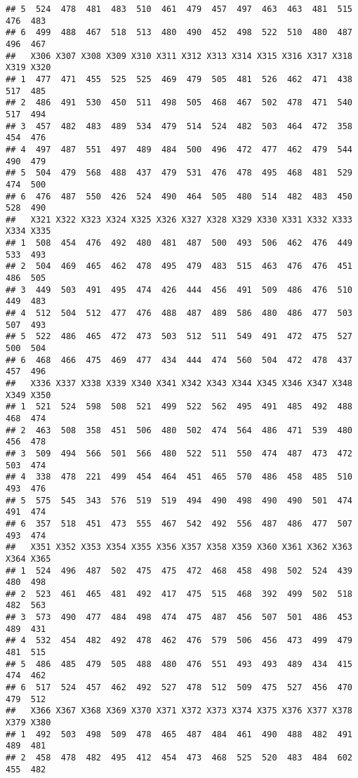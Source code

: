 \documentclass[
]{article}
\begin{document}
\begin{verbatim}
## 5  524  478  481  483  510  461  479  457  497  463  463  481  515  476  483
## 6  499  488  467  518  513  480  490  452  498  522  510  480  487  496  467
##   X306 X307 X308 X309 X310 X311 X312 X313 X314 X315 X316 X317 X318 X319 X320
## 1  477  471  455  525  525  469  479  505  481  526  462  471  438  517  485
## 2  486  491  530  450  511  498  505  468  467  502  478  471  540  517  494
## 3  457  482  483  489  534  479  514  524  482  503  464  472  358  454  476
## 4  497  487  551  497  489  484  500  496  472  477  462  479  544  490  479
## 5  504  479  568  488  437  479  531  476  478  495  468  481  529  474  500
## 6  476  487  550  426  524  490  464  505  480  514  482  483  450  528  490
##   X321 X322 X323 X324 X325 X326 X327 X328 X329 X330 X331 X332 X333 X334 X335
## 1  508  454  476  492  480  481  487  500  493  506  462  476  449  533  493
## 2  504  469  465  462  478  495  479  483  515  463  476  476  451  486  505
## 3  449  503  491  495  474  426  444  456  491  509  486  476  510  449  483
## 4  512  504  512  477  476  488  487  489  586  480  486  477  503  507  493
## 5  522  486  465  472  473  503  512  511  549  491  472  475  527  500  504
## 6  468  466  475  469  477  434  444  474  560  504  472  478  437  457  496
##   X336 X337 X338 X339 X340 X341 X342 X343 X344 X345 X346 X347 X348 X349 X350
## 1  521  524  598  508  521  499  522  562  495  491  485  492  488  468  474
## 2  463  508  358  451  506  480  502  474  564  486  471  539  480  456  478
## 3  509  494  566  501  566  480  522  511  550  474  487  473  472  503  474
## 4  338  478  221  499  454  464  451  465  570  486  458  485  510  493  476
## 5  575  545  343  576  519  519  494  490  498  490  490  501  474  491  474
## 6  357  518  451  473  555  467  542  492  556  487  486  477  507  493  474
##   X351 X352 X353 X354 X355 X356 X357 X358 X359 X360 X361 X362 X363 X364 X365
## 1  524  496  487  502  475  475  472  468  458  498  502  524  439  480  498
## 2  523  461  465  481  492  417  475  515  468  392  499  502  518  482  563
## 3  573  490  477  484  498  474  475  487  456  507  501  486  453  489  431
## 4  532  454  482  492  478  462  476  579  506  456  473  499  479  481  515
## 5  486  485  479  505  488  480  476  551  493  493  489  434  415  474  462
## 6  517  524  457  462  492  527  478  512  509  475  527  456  470  479  512
##   X366 X367 X368 X369 X370 X371 X372 X373 X374 X375 X376 X377 X378 X379 X380
## 1  492  503  498  509  478  465  487  484  461  490  488  482  491  489  481
## 2  458  478  482  495  412  454  473  468  525  520  483  484  602  455  482

\end{verbatim}
\end{document}

